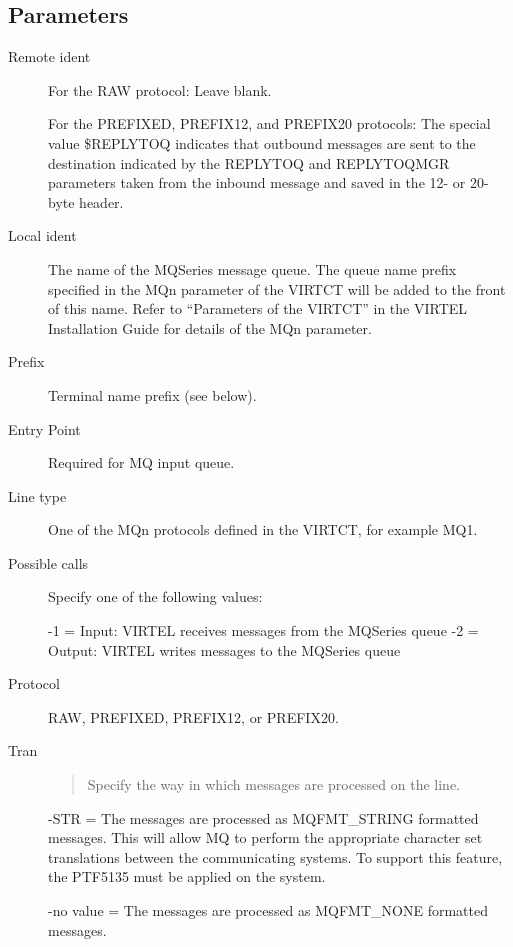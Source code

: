 \documentclass[letterpaper,10pt,english]{sphinxmanual}
\begin{document}

\ignorespaces 

\subsection{Parameters}
\label{\detokenize{connectivity_guide:index-29}}\label{\detokenize{connectivity_guide:id8}}\begin{description}
\item[{Remote ident}] \leavevmode
For the RAW protocol: Leave blank.

For the PREFIXED, PREFIX12, and PREFIX20 protocols: The special
value \$REPLYTOQ indicates that outbound messages are sent to the
destination indicated by the REPLYTOQ and REPLYTOQMGR parameters
taken from the inbound message and saved in the 12- or 20-byte
header.

\item[{Local ident}] \leavevmode
The name of the MQSeries message queue. The queue name prefix
specified in the MQn parameter of the VIRTCT will be added to the
front of this name. Refer to “Parameters of the VIRTCT” in the
VIRTEL Installation Guide for details of the MQn parameter.

\item[{Prefix}] \leavevmode
Terminal name prefix (see below).

\item[{Entry Point}] \leavevmode
Required for MQ input queue.

\item[{Line type}] \leavevmode
One of the MQn protocols defined in the VIRTCT, for example MQ1.

\item[{Possible calls}] \leavevmode
Specify one of the following values:

-1 = Input: VIRTEL receives messages from the MQSeries queue
-2 = Output: VIRTEL writes messages to the MQSeries queue

\item[{Protocol}] \leavevmode
RAW, PREFIXED, PREFIX12, or PREFIX20.

\item[{Tran}] \leavevmode\begin{quote}

Specify the way in which messages are processed on the line.
\end{quote}

-STR = The messages are processed as MQFMT\_STRING formatted messages. This will allow MQ to perform the appropriate character set translations between the communicating systems. To support this feature, the PTF5135 must be applied on the system.

-no value = The messages are processed as MQFMT\_NONE formatted messages.

\end{description}
\end{document}
